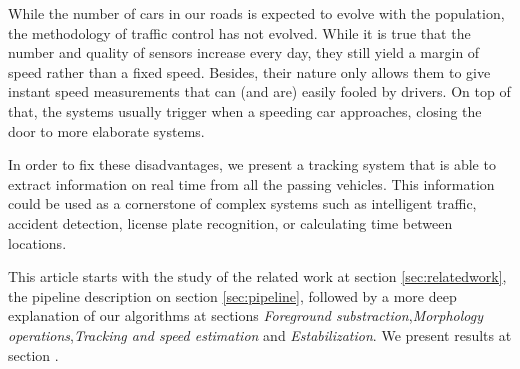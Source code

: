 While the number of cars in our roads is expected to evolve with the population, the methodology of traffic control has not evolved. While it is true that the number and quality of sensors increase every day, they still yield a margin of speed rather than a fixed speed. Besides, their nature only allows them to give instant speed measurements that can (and are) easily fooled by drivers. On top of that, the systems usually trigger when a speeding car approaches, closing the door to more elaborate systems.

In order to fix these disadvantages, we present a tracking system that is able to extract information on real time from all the passing vehicles. This information could be used as a cornerstone of complex systems such as intelligent traffic, accident detection, license plate recognition, or calculating time between locations.

This article starts with the study of the related work at section \ref{sec:relatedwork}, the pipeline description on section \ref{sec:pipeline}, followed by a more deep explanation of our algorithms at sections \textit{Foreground substraction},\textit{Morphology operations},\textit{Tracking and speed estimation} and \textit{Estabilization}. We present results at section .
